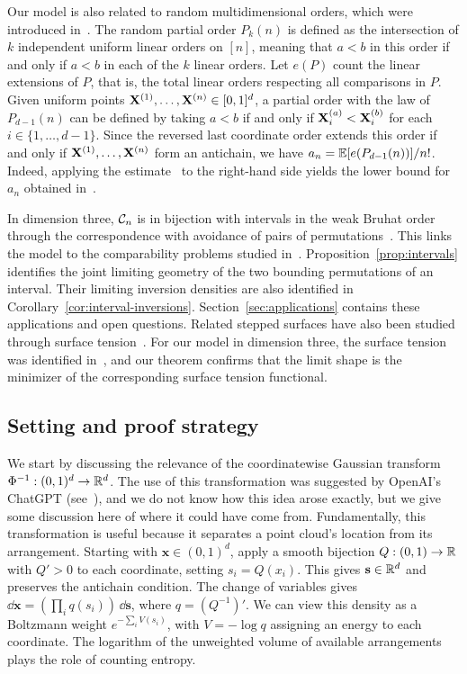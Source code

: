 \documentclass[11pt,letterpaper]{article}
\begin{document}
Our model is also related to random multidimensional orders, which were introduced in~\cite{winkler1985random}. The random partial order $P_k(n)$ is defined as the intersection of $k$ independent uniform
linear orders on $[n]$, meaning that $a<b$ in this order if and only if $a<b$ in each of the $k$ linear orders. Let $e(P)$ count the linear
extensions of $P$, that is, the total linear orders respecting all
comparisons in $P$. Given uniform points $\mathbf X^{(1)},\ldots,\mathbf X^{(n)}\in [0,1]^{d}$, a partial order with the law of $P_{d-1}(n)$ can be defined by taking $a<b$ if and only if $\mathbf X^{(a)}_{i}<\mathbf X^{(b)}_{i}$ for each $i\in\{1,\ldots,d-1\}$. Since the reversed last coordinate order
extends this order if and only if $\mathbf X^{(1)},\ldots,\mathbf X^{(n)}$ form an antichain, we have
$a_n=\mathbb E[e(P_{d-1}(n))]/n!$. Indeed, applying the estimate~\cite[Corollary~4]{Brightwell} to the right-hand side yields the lower bound for $a_n$ obtained in~\cite[Theorem~8.4]{CK}.

In dimension three, $\mathcal C_n$ is in bijection with intervals in the weak Bruhat order through the correspondence with avoidance of pairs of permutations~\cite{GP,BM}. This links the model to the comparability problems studied in~\cite{HP,BCHHLM}. Proposition~\ref{prop:intervals} identifies the joint limiting geometry of the two bounding permutations of an interval.
Their limiting inversion densities are also identified in Corollary~\ref{cor:interval-inversions}. Section~\ref{sec:applications} contains these applications and open questions. Related stepped surfaces have also been studied through surface tension~\cite{Sheffield}. For our model in dimension three, the surface tension was identified in~\cite{KenyonComm}, and our theorem confirms that the limit shape is the minimizer of the corresponding surface tension functional.

\subsection{Setting and proof strategy}

We start by discussing the relevance of the coordinatewise Gaussian transform $\Phi^{-1}:(0,1)^d\to\mathbb R^{d}$. The use of this transformation was suggested by OpenAI's ChatGPT (see~), and we do not know how this idea arose exactly, but we give some discussion here of where it could have come from. Fundamentally, this transformation is useful because it separates a point cloud's location from its arrangement. Starting with $\mathbf x\in(0,1)^d$, apply a smooth bijection $Q:(0,1)\to\mathbb R$ with $Q'>0$ to each coordinate, setting $s_i=Q(x_i)$. This gives $\mathbf s\in\mathbb R^d$ and preserves the antichain condition. The change of variables gives $\dd\mathbf x=(\prod_iq(s_i))\,\dd\mathbf s$, where $q=(Q^{-1})'$. We can view this density as a Boltzmann weight $e^{-\sum_iV(s_i)}$, with $V=-\log q$ assigning an energy to each coordinate. The logarithm of the unweighted volume of available arrangements plays the role of counting entropy.
\end{document}

